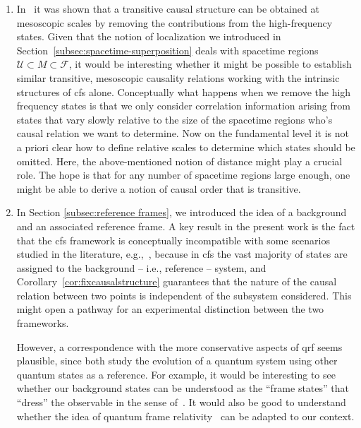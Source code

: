 \documentclass[reqno,11pt]{amsart}
\newcommand{\F}{{\mathcal{F}}}
\numberwithin{equation}{section}
\begin{document}
\begin{enumerate}
    The discussion in Section \ref{subsec:spacetime-superposition} then provides us with a clear framework for the superposition of such correlation geometries, and in the continuum limit the fluctuations go to zero. This would provide a physical explanation for the well-known result~\cite[Section 1.2.5]{cfs} that the causal structure becomes transitive, i.e.~completely well behaved/classical in the continuum limit.
    At present, however, it is unclear to the authors how to define such a notion of distance in a way that it has all the desired properties.

    \item In~\cite{dappiaggi2018linearized,finster2022construction} it was shown that a transitive causal structure can be obtained at mesoscopic scales by removing the contributions from the high-frequency states. Given that the notion of localization we introduced in Section~\ref{subsec:spacetime-superposition} deals with spacetime regions $\mathcal{U}\subset M\subset \F$, it would be interesting whether it might be possible to establish similar transitive, mesoscopic causality relations working with the intrinsic structures of \ac{cfs} alone. Conceptually what happens when we remove the high frequency states is that we only consider correlation information arising from states that vary slowly relative to the size of the spacetime regions who's causal relation we want to determine. Now on the fundamental level it is not a priori clear how to define relative scales to determine which states should be omitted. Here, the above-mentioned notion of distance might play a crucial role. The hope is that for any number of spacetime regions large enough, one might be able to derive a notion of causal order that is transitive.   

    
    \item In Section \ref{subsec:reference frames}, we introduced the idea of a background and an associated reference frame.  
    A key result in the present work is the fact that the \ac{cfs} framework is conceptually incompatible with some scenarios studied in the literature, e.g.,~\cite{zych2019bell}, because in \ac{cfs} the vast majority of states are assigned to the background -- i.e., reference -- system, and Corollary~\ref{cor:fixcausalstructure} guarantees that the nature of the causal relation between two points is independent of the subsystem considered. This might open a pathway for an experimental distinction between the two frameworks.
    
    However, a correspondence with the more conservative aspects of \ac{qrf} seems plausible, since both study the evolution of a quantum system using other quantum states as a reference. For example, it would be interesting to see whether our background states can be understood as the ``frame states'' that ``dress'' the observable in the sense of~\cite{goeller2022frames}. It would also be good to understand whether the idea of quantum frame relativity~\cite{quantumFrameRelativity} can be adapted to our context.
    

\end{enumerate}
\end{document}
